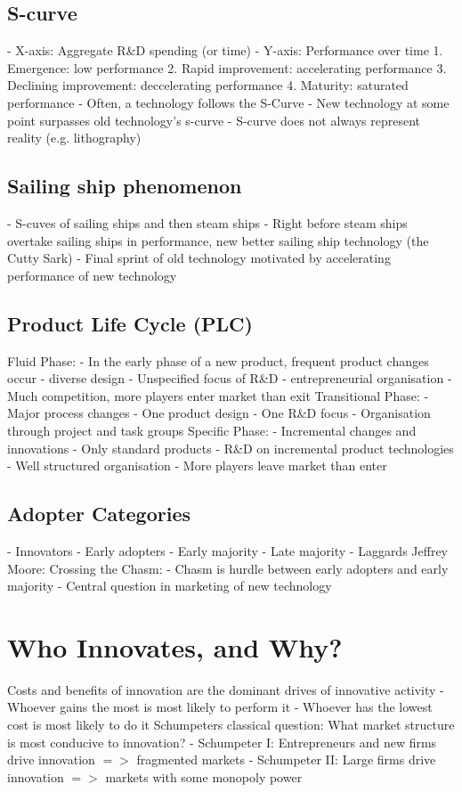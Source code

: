 \documentclass{scrartcl}
\begin{document}
\subsection*{S-curve}
- X-axis: Aggregate R\&D spending (or time)
- Y-axis: Performance over time
1. Emergence: low performance
2. Rapid improvement: accelerating performance
3. Declining improvement: deccelerating performance
4. Maturity: saturated performance
- Often, a technology follows the S-Curve
- New technology at some point surpasses old technology's s-curve
- S-curve does not always represent reality (e.g. lithography)
\subsection*{Sailing ship phenomenon}
- S-cuves of sailing ships and then steam ships
- Right before steam ships overtake sailing ships in performance, new better sailing ship technology (the Cutty Sark)
- Final sprint of old technology motivated by accelerating performance of new technology
\subsection*{Product Life Cycle (PLC)}
Fluid Phase:
- In the early phase of a new product, frequent product changes occur
- diverse design
- Unspecified focus of R\&D
- entrepreneurial organisation
- Much competition, more players enter market than exit
Transitional Phase:
- Major process changes
- One product design
- One R\&D focus
- Organisation through project and task groups
Specific Phase:
- Incremental changes and innovations
- Only standard products
- R\&D on incremental product technologies
- Well structured organisation
- More players leave market than enter
\subsection*{Adopter Categories}
- Innovators
- Early adopters
- Early majority
- Late majority
- Laggards
Jeffrey Moore: Crossing the Chasm:
- Chasm is hurdle between early adopters and early majority
- Central question in marketing of new technology

\section*{Who Innovates, and Why?}
Costs and benefits of innovation are the dominant drives of innovative activity
- Whoever gains the most is most likely to perform it
- Whoever has the lowest cost is most likely to do it
Schumpeters classical question: What market structure is most conducive to innovation?
- Schumpeter I: Entrepreneurs and new firms drive innovation $=>$ fragmented markets
- Schumpeter II: Large firms drive innovation $=>$ markets with some monopoly power
\end{document}
